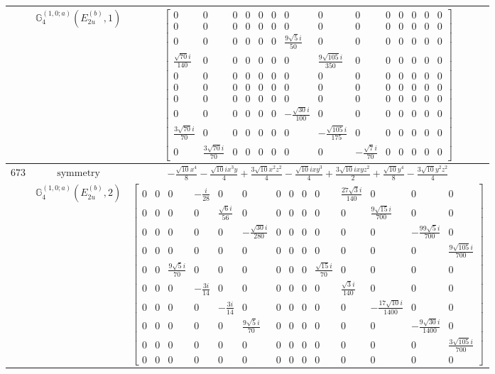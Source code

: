 \documentclass[fleqn,8pt,landscape]{jsarticle}
\begin{document}
\begin{longtable}{ccc}
$  $ & $ \mathbb{G}_{4}^{(1,0;a)}(E_{2u}^{(b)},1) $ & $ \begin{bmatrix} 0 & 0 & 0 & 0 & 0 & 0 & 0 & 0 & 0 & 0 & 0 & 0 & 0 & 0 \\ 0 & 0 & 0 & 0 & 0 & 0 & 0 & 0 & 0 & 0 & 0 & 0 & 0 & 0 \\ 0 & 0 & 0 & 0 & 0 & 0 & \frac{9 \sqrt{5} i}{50} & 0 & 0 & 0 & 0 & 0 & 0 & 0 \\ \frac{\sqrt{70} i}{140} & 0 & 0 & 0 & 0 & 0 & 0 & \frac{9 \sqrt{105} i}{350} & 0 & 0 & 0 & 0 & 0 & 0 \\ 0 & 0 & 0 & 0 & 0 & 0 & 0 & 0 & 0 & 0 & 0 & 0 & 0 & 0 \\ 0 & 0 & 0 & 0 & 0 & 0 & 0 & 0 & 0 & 0 & 0 & 0 & 0 & 0 \\ 0 & 0 & 0 & 0 & 0 & 0 & 0 & 0 & 0 & 0 & 0 & 0 & 0 & 0 \\ 0 & 0 & 0 & 0 & 0 & 0 & - \frac{\sqrt{30} i}{100} & 0 & 0 & 0 & 0 & 0 & 0 & 0 \\ \frac{3 \sqrt{70} i}{70} & 0 & 0 & 0 & 0 & 0 & 0 & - \frac{\sqrt{105} i}{175} & 0 & 0 & 0 & 0 & 0 & 0 \\ 0 & \frac{3 \sqrt{70} i}{70} & 0 & 0 & 0 & 0 & 0 & 0 & - \frac{\sqrt{7} i}{70} & 0 & 0 & 0 & 0 & 0 \end{bmatrix} $ \\ \hline
$ 673 $ & $ \text{symmetry} $ & $ - \frac{\sqrt{10} x^{4}}{8} - \frac{\sqrt{10} i x^{3} y}{4} + \frac{3 \sqrt{10} x^{2} z^{2}}{4} - \frac{\sqrt{10} i x y^{3}}{4} + \frac{3 \sqrt{10} i x y z^{2}}{2} + \frac{\sqrt{10} y^{4}}{8} - \frac{3 \sqrt{10} y^{2} z^{2}}{4} $ \\
$  $ & $ \mathbb{G}_{4}^{(1,0;a)}(E_{2u}^{(b)},2) $ & $ \begin{bmatrix} 0 & 0 & 0 & - \frac{i}{28} & 0 & 0 & 0 & 0 & 0 & 0 & \frac{27 \sqrt{3} i}{140} & 0 & 0 & 0 \\ 0 & 0 & 0 & 0 & \frac{\sqrt{6} i}{56} & 0 & 0 & 0 & 0 & 0 & 0 & \frac{9 \sqrt{15} i}{700} & 0 & 0 \\ 0 & 0 & 0 & 0 & 0 & - \frac{\sqrt{30} i}{280} & 0 & 0 & 0 & 0 & 0 & 0 & - \frac{99 \sqrt{5} i}{700} & 0 \\ 0 & 0 & 0 & 0 & 0 & 0 & 0 & 0 & 0 & 0 & 0 & 0 & 0 & \frac{9 \sqrt{105} i}{700} \\ 0 & 0 & \frac{9 \sqrt{5} i}{70} & 0 & 0 & 0 & 0 & 0 & 0 & \frac{\sqrt{15} i}{70} & 0 & 0 & 0 & 0 \\ 0 & 0 & 0 & - \frac{3 i}{14} & 0 & 0 & 0 & 0 & 0 & 0 & \frac{\sqrt{3} i}{140} & 0 & 0 & 0 \\ 0 & 0 & 0 & 0 & - \frac{3 i}{14} & 0 & 0 & 0 & 0 & 0 & 0 & - \frac{17 \sqrt{10} i}{1400} & 0 & 0 \\ 0 & 0 & 0 & 0 & 0 & \frac{9 \sqrt{5} i}{70} & 0 & 0 & 0 & 0 & 0 & 0 & - \frac{9 \sqrt{30} i}{1400} & 0 \\ 0 & 0 & 0 & 0 & 0 & 0 & 0 & 0 & 0 & 0 & 0 & 0 & 0 & \frac{3 \sqrt{105} i}{700} \\ 0 & 0 & 0 & 0 & 0 & 0 & 0 & 0 & 0 & 0 & 0 & 0 & 0 & 0 \end{bmatrix} $ \\ \hline

\end{longtable}
\end{document}
